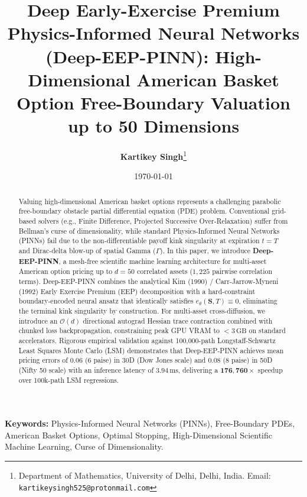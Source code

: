\documentclass[11pt,a4paper]{article}
\title{\textbf{Deep Early-Exercise Premium Physics-Informed Neural Networks (Deep-EEP-PINN): High-Dimensional American Basket Option Free-Boundary Valuation up to 50 Dimensions}}
\author{
    \textbf{Kartikey Singh}\thanks{Department of Mathematics, University of Delhi, Delhi, India. Email: \texttt{kartikeysingh525@protonmail.com}}
}
\date{\today}
\begin{document}
\maketitle

\begin{abstract}
Valuing high-dimensional American basket options represents a challenging parabolic free-boundary obstacle partial differential equation (PDE) problem. Conventional grid-based solvers (e.g., Finite Difference, Projected Successive Over-Relaxation) suffer from Bellman's curse of dimensionality, while standard Physics-Informed Neural Networks (PINNs) fail due to the non-differentiable payoff kink singularity at expiration $t=T$ and Dirac-delta blow-up of spatial Gamma ($\Gamma$). In this paper, we introduce \textbf{Deep-EEP-PINN}, a mesh-free scientific machine learning architecture for multi-asset American option pricing up to $d=50$ correlated assets ($1,225$ pairwise correlation terms). Deep-EEP-PINN combines the analytical Kim (1990) / Carr-Jarrow-Myneni (1992) Early Exercise Premium (EEP) decomposition with a hard-constraint boundary-encoded neural ansatz that identically satisfies $e_\theta(\mathbf{S}, T) \equiv 0$, eliminating the terminal kink singularity by construction. For multi-asset cross-diffusion, we introduce an $\mathcal{O}(d)$ directional autograd Hessian trace contraction combined with chunked loss backpropagation, constraining peak GPU VRAM to $< 3\,\text{GB}$ on standard accelerators. Rigorous empirical validation against 100,000-path Longstaff-Schwartz Least Squares Monte Carlo (LSM) demonstrates that Deep-EEP-PINN achieves mean pricing errors of 0.06 (6 paise) in 30D (Dow Jones scale) and 0.08 (8 paise) in 50D (Nifty 50 scale) with an inference latency of $3.94\,\text{ms}$, delivering a $\mathbf{176,760\times}$ speedup over 100k-path LSM regressions.
\end{abstract}

\noindent\textbf{Keywords:} Physics-Informed Neural Networks (PINNs), Free-Boundary PDEs, American Basket Options, Optimal Stopping, High-Dimensional Scientific Machine Learning, Curse of Dimensionality.
\end{document}
